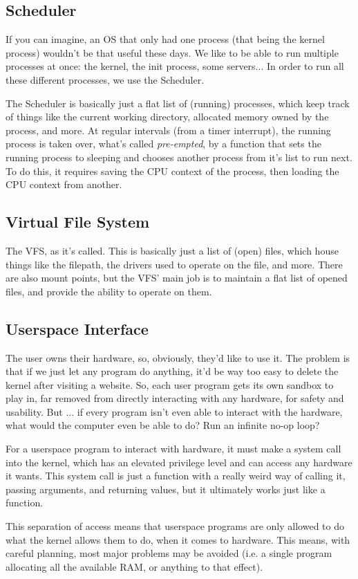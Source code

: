 \documentclass[onepage=true]{article}
\begin{document}
\subsection{Scheduler}

If you can imagine, an OS that only had one process (that being the kernel process) wouldn't be that useful these days. We like to be able to run multiple processes at once: the kernel, the init process, some servers... In order to run all these different processes, we use the Scheduler.

The Scheduler is basically just a flat list of (running) processes, which keep track of things like the current working directory, allocated memory owned by the process, and more. At regular intervals (from a timer interrupt), the running process is taken over, what's called \emph{pre-empted}, by a function that sets the running process to sleeping and chooses another process from it's list to run next. To do this, it requires saving the CPU context of the process, then loading the CPU context from another.

\subsection{Virtual File System}

The VFS, as it's called. This is basically just a list of (open) files, which house things like the filepath, the drivers used to operate on the file, and more. There are also mount points, but the VFS' main job is to maintain a flat list of opened files, and provide the ability to operate on them.

\subsection{Userspace Interface}

The user owns their hardware, so, obviously, they'd like to use it. The problem is that if we just let any program do anything, it'd be way too easy to delete the kernel after visiting a website. So, each user program gets its own sandbox to play in, far removed from directly interacting with any hardware, for safety and usability. But ... if every program isn't even able to interact with the hardware, what would the computer even be able to do? Run an infinite no-op loop?

For a userspace program to interact with hardware, it must make a system call into the kernel, which has an elevated privilege level and can access any hardware it wants. This system call is just a function with a really weird way of calling it, passing arguments, and returning values, but it ultimately works just like a function.

This separation of access means that userspace programs are only allowed to do what the kernel allows them to do, when it comes to hardware. This means, with careful planning, most major problems may be avoided (i.e. a single program allocating all the available RAM, or anything to that effect).
\end{document}
